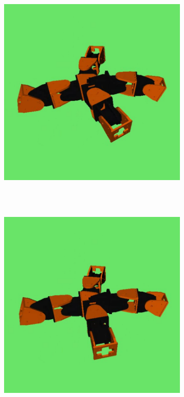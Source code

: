 \begin{figure}[h]
\begin{subfigure}[b]{0.18\textwidth}
                 \\~
        \end{subfigure}
        ~
                \begin{subfigure}[b]{0.18\textwidth}
                \centering
                \includegraphics[width=\textwidth]{images/results_9_gait_06.png}
                 \\~
        \end{subfigure}
        ~
        \begin{subfigure}[b]{0.18\textwidth}
                \centering
                \includegraphics[width=\textwidth]{images/results_9_gait_07.png}

\end{subfigure}
\end{figure}
